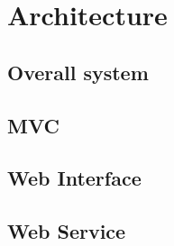 \chapter{Architecture}
\label{ch:architecture}


\section{Overall system}


\section{MVC}


\section{Web Interface}


\section{Web Service}

